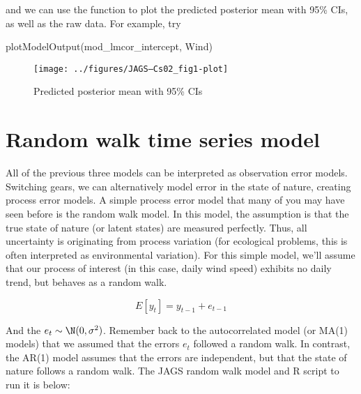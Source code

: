 and we can use the function to plot the predicted posterior mean with 95\% CIs, as well as the raw data. For example, try
\begin{Schunk}
\begin{Sinput}
 plotModelOutput(mod_lmcor_intercept, Wind)
\end{Sinput}
\end{Schunk}

\begin{figure}[htp]
\begin{center}
\texttt{[image: ../figures/JAGS--Cs02\_fig1-plot]}
\end{center}
\caption{Predicted posterior mean with 95\% CIs }
\label{fig:posteriors}
\end{figure}


\section{Random walk time series model}\label{sec:rw}

All of the previous three models can be interpreted as observation error models. Switching gears, we can alternatively model error in the state of nature, creating process error models. A simple process error model that many of you may have seen before is the random walk model. In this model, the assumption is that the true state of nature (or latent states) are measured perfectly. Thus, all uncertainty is originating from process variation (for ecological problems, this is often interpreted as environmental variation). For this simple model, we'll assume that our process of interest (in this case, daily wind speed) exhibits no daily trend, but behaves as a random walk. 

\begin{equation}
E[{y_t}] = y_{t-1} + e_{t-1}
\end{equation}

And the ${e}_{t} \sim \N(0, \sigma^2)$. Remember back to the autocorrelated model (or MA(1) models) that we assumed that the errors $e_t$ followed a random walk. In contrast, the AR(1) model assumes that the errors are independent, but that the state of nature follows a random walk. The JAGS random walk model and R script to run it is below:


